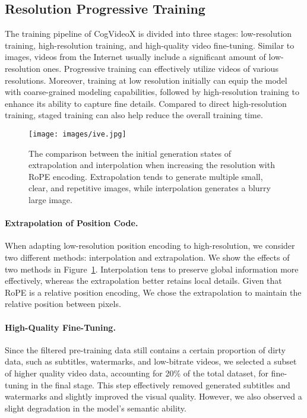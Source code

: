\documentclass{article} \usepackage{iclr2024_conference,times}
\newcommand{\model}{CogVideoX\xspace}
\begin{document}
\subsection{Resolution Progressive Training}

The training pipeline of \model is divided into three stages: low-resolution training, high-resolution training, and high-quality video fine-tuning. 
Similar to images, videos from the Internet usually include a significant amount of low-resolution ones. 
Progressive training can effectively utilize videos of various resolutions. 
Moreover, training at low resolution initially can equip the model with coarse-grained modeling capabilities, followed by high-resolution training to enhance its ability to capture fine details. 
Compared to direct high-resolution training, staged training can also help reduce the overall training time.

\begin{figure}[h]
\begin{center}
\texttt{[image: images/ive.jpg]}
\end{center}
\caption{The comparison between the initial generation states of extrapolation and interpolation when increasing the resolution with RoPE encoding. Extrapolation tends to generate multiple small, clear, and repetitive images, while interpolation generates a blurry large image.}
\label{fig:ive}
\end{figure}

\paragraph{Extrapolation of Position Code.}
When adapting low-resolution position encoding to high-resolution, we consider two different methods: interpolation and extrapolation. We show the effects of two methods in Figure~\ref{fig:ive}. Interpolation tens to preserve global information more effectively, whereas the extrapolation better retains local details. Given that RoPE is a relative position encoding, We chose the extrapolation to maintain the relative position between pixels. 

\paragraph{High-Quality Fine-Tuning.}
Since the filtered pre-training data still contains a certain proportion of dirty data, such as subtitles, watermarks, and low-bitrate videos, we selected a subset of higher quality video data, accounting for 20\% of the total dataset, for fine-tuning in the final stage. This step effectively removed generated subtitles and watermarks and slightly improved the visual quality. However, we also observed a slight degradation in the model's semantic ability.
\end{document}

